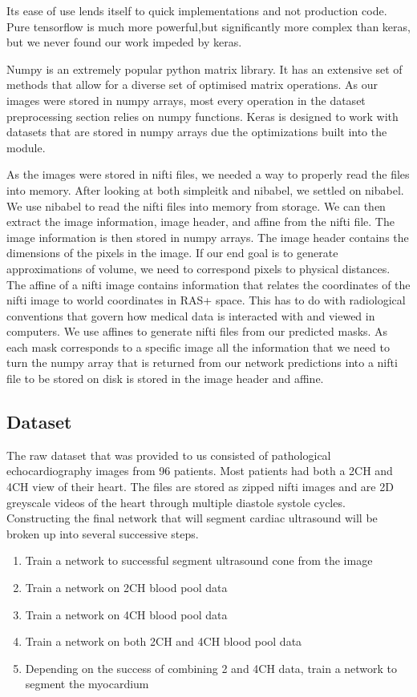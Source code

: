 \documentclass[12pt]{article}
\begin{document}
Its ease of use lends itself to quick implementations and not production code.
Pure tensorflow is much more powerful,but significantly more complex than keras, but we never found our work impeded by keras.
\par
Numpy is an extremely popular python matrix library.
It has an extensive set of methods that allow for a diverse set of optimised matrix operations.
As our images were stored in numpy arrays, most every operation in the dataset preprocessing section relies on numpy functions.
Keras is designed to work with datasets that are stored in numpy arrays due the optimizations built into the module.
\par
As the images were stored in nifti files, we needed a way to properly read the files into memory.
After looking at both simpleitk and nibabel, we settled on nibabel.
We use nibabel to read the nifti files into memory from storage.
We can then extract the image information, image header, and affine from the nifti file.
The image information is then stored in numpy arrays.
The image header contains the dimensions of the pixels in the image.
If our end goal is to generate approximations of volume, we need to correspond pixels to physical distances.
The affine of a nifti image contains information that relates the coordinates of the nifti image to world coordinates in RAS+ space. 
This has to do with radiological conventions that govern how medical data is interacted with and viewed in computers.
We use affines to generate nifti files from our predicted masks.
As each mask corresponds to a specific image all the information that we need to turn the numpy array that is returned from our network predictions into a nifti file to be stored on disk is stored in the image header and affine.

\subsection{Dataset}
\par
The raw dataset that was provided to us consisted of pathological echocardiography images from 96 patients. 
Most patients had both a 2CH and 4CH view of their heart. The files are stored as zipped nifti images and are 2D greyscale videos of the heart through multiple diastole systole cycles.
Constructing the final network that will segment cardiac ultrasound will be broken up into several successive steps.

\begin{enumerate}
\item Train a network to successful segment ultrasound cone from the image
\item Train a network on 2CH blood pool data
\item Train a network on 4CH blood pool data
\item Train a network on both 2CH and 4CH blood pool data
\item Depending on the success of combining 2 and 4CH data, train a network to segment the myocardium
\end{enumerate}
\end{document}
